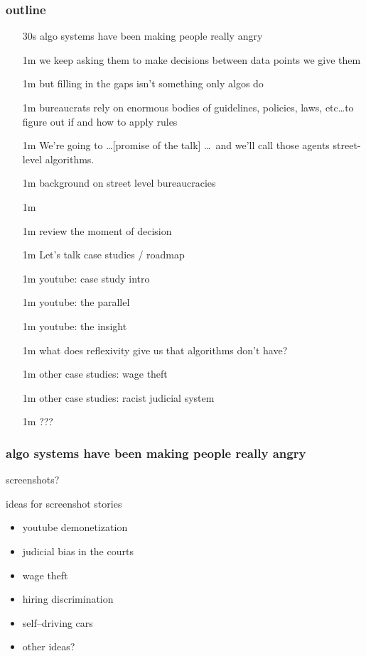 \documentclass[presentation]{subfiles}
\begin{document}
\begin{frame}[t,shrink=30]\frametitle{outline}

\begin{itemize}
  \item[30s] algo systems have been making people really angry
  \item[1m]  we keep asking them to make decisions between data points we give them
  \item[1m]  but filling in the gaps isn't something only algos do
  \item[1m]  \alert{bureaucrats} rely on enormous bodies of guidelines, policies, laws, etc\dots to figure out if and how to apply rules
  \item[1m]  We're going to \dots [promise of the talk] \dots~and we'll call those agents \alert{street-level algorithms}.
  \item[1m]  background on street level bureaucracies
  \item[1m]  
  \item[1m]  review the moment of decision
  \item[1m]  Let's talk case studies / roadmap
  \item[1m]  youtube: case study intro
  \item[1m]  youtube: the parallel
  \item[1m]  youtube: the insight
  \item[1m]  what does reflexivity give us that algorithms don't have?
  \item[1m]  other case studies: wage theft
  \item[1m]  other case studies: racist judicial system
  \item[1m]  ???

\end{itemize}
\end{frame}

\begin{frame}\frametitle{algo systems have been making people really angry}
screenshots?

ideas for screenshot stories
\begin{itemize}
  \item youtube demonetization
  \item judicial bias in the courts
  \item wage theft
  \item hiring discrimination
  \item self--driving cars
  \item other ideas?
\end{itemize}
\end{frame}
\end{document}
